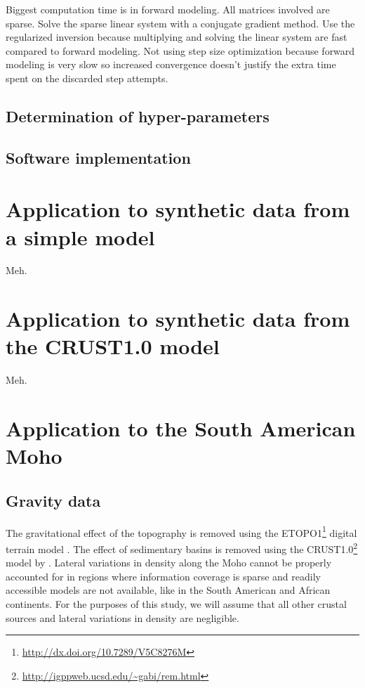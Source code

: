 \documentclass[extra,mreferee]{gji}
\begin{document}
Biggest computation time is in forward modeling.
All matrices involved are sparse.
Solve the sparse linear system with a conjugate gradient method.
Use the regularized inversion because multiplying and solving the linear system
are fast compared to forward modeling.
Not using step size optimization because forward modeling is very slow so
increased convergence doesn't justify the extra time spent on the discarded
step attempts.

\subsection{Determination of hyper-parameters}



\subsection{Software implementation}



\section{Application to synthetic data from a simple model}


Meh.


\section{Application to synthetic data from the CRUST1.0 model}

Meh.


\section{Application to the South American Moho}


\subsection{Gravity data}

The gravitational effect of the topography
is removed using the
ETOPO1\footnote{\url{http://dx.doi.org/10.7289/V5C8276M}}
digital terrain model
\citep{amante2009}.
The effect of sedimentary basins is removed using the
CRUST1.0\footnote{\url{http://igppweb.ucsd.edu/~gabi/rem.html}} model
by
\citet{laske2013}.
Lateral variations in density along the Moho cannot be properly accounted for
in regions where information coverage is sparse and readily accessible models
are not available, like in the South American and African continents.
For the purposes of this study, we will assume that all other crustal sources
and lateral variations in density are negligible.
\end{document}
